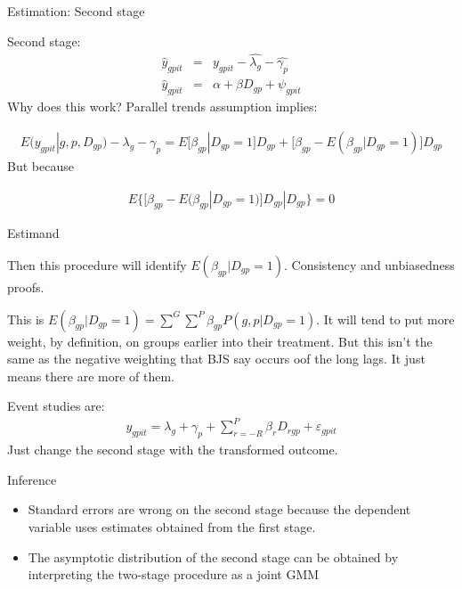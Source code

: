 \documentclass{beamer}
\begin{document}
\begin{frame}{Estimation: Second stage}

Second stage:
\begin{eqnarray*}
\widehat{y}_{gpit} &=& y_{gpit} - \widehat{\lambda_g} - \widehat{\gamma_p} \\
\widehat{y}_{gpit} &=& \alpha + \beta D_{gp} + \psi_{gpit}
\end{eqnarray*}Why does this work? Parallel trends assumption implies:

\bigskip

\footnotesize
\begin{eqnarray*}
E(y_{gpit} | g,p,D_{gp}) - \lambda_g - \gamma_p = E \bigg [ \beta_{gp} | D_{gp}=1 \bigg ] D_{gp} + \bigg [ \beta_{gp} - E(\beta_{gp} | D_{gp}=1) \bigg ] D_{gp}
\end{eqnarray*}But because

\begin{eqnarray*}
E \bigg \{ [ \beta_{gp} - E( \beta_{gp} | D_{gp} =1) ] D_{gp} | D_{gp} \bigg \} = 0
\end{eqnarray*}


\end{frame}

\begin{frame}{Estimand}

Then this procedure will identify $E(\beta_{gp} | D_{gp}=1)$. Consistency and unbiasedness proofs. 

\bigskip

This is $E(\beta_{gp}|D_{gp}=1) = \sum^G \sum^P \beta_{gp} P(g,p|D_{gp}=1)$. It will tend to put more weight, by definition, on groups earlier into their treatment.  But this isn't the same as the negative weighting that BJS say occurs oof the long lags.  It just means there are more of them.

\bigskip

Event studies are:
\begin{eqnarray*}
y_{gpit} = \lambda_g + \gamma_p + \sum_{r=-R}^P \beta_rD_{rgp} + \varepsilon_{gpit}
\end{eqnarray*}Just change the second stage with the transformed outcome. 

\end{frame}

\begin{frame}{Inference}

\begin{itemize}
\item Standard errors are wrong on the second stage because the dependent variable uses estimates obtained from the first stage. 
\item The asymptotic distribution of the second stage can be obtained by interpreting the two-stage procedure as a joint GMM
\end{itemize}

\end{frame}
\end{document}
